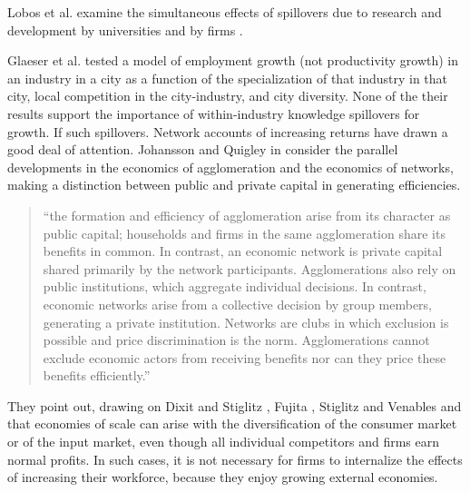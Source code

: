 Lobos et al. examine the simultaneous effects of spillovers due to research and development by universities and by firms \cite{belderbosWhatSpilloversUniversities2022}.

Glaeser et al. \cite{glaeserGrowthCities1991} tested a model  of employment growth (not productivity growth) in an industry in a city as a function of the specialization of that industry in that city, local competition in the city-industry, and city diversity. None of the their results  support the importance
of within-industry knowledge spillovers for growth. If such spillovers. %
Network accounts of increasing returns have drawn a good deal of attention.
Johansson and Quigley \cite{johanssonAgglomerationNetworksSpatial} in \cite{floraxFiftyYearsRegional2004} consider the parallel developments in the economics of agglomeration and the economics of networks, making a distinction between public and private capital in generating efficiencies.

\begin{quotation}
``the formation and efficiency of agglomeration arise from its character as public capital; households and firms in the same agglomeration share its benefits in common. In contrast, an economic network is private capital shared primarily by the network participants. Agglomerations also rely on public institutions, which aggregate individual decisions. In contrast, economic networks arise from a collective decision by group members, generating a private institution. Networks are clubs in which exclusion is possible and price discrimination is the norm. Agglomerations cannot exclude economic actors from receiving benefits nor can they price these benefits efficiently.''
\end{quotation}
They point out, drawing on Dixit and Stiglitz \cite{AvinashK.Dixit1977MCaO},  Fujita \cite{fujitaMonopolisticCompetitionModel1988}, Stiglitz and Venables and \cite{fujitaSpatialEconomyCities1999} that economies of scale  can arise with the diversification of the consumer market or of the input market, even though all individual competitors and firms earn normal profits. In such cases, it is not necessary for firms to internalize the effects of increasing their workforce, because they enjoy growing external economies.

